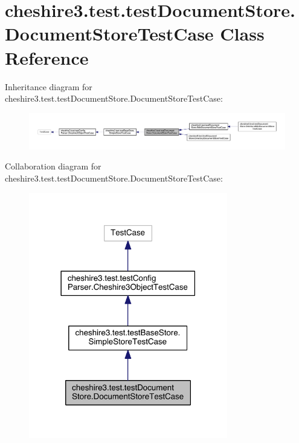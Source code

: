 \hypertarget{classcheshire3_1_1test_1_1test_document_store_1_1_document_store_test_case}{\section{cheshire3.\-test.\-test\-Document\-Store.\-Document\-Store\-Test\-Case Class Reference}
\label{classcheshire3_1_1test_1_1test_document_store_1_1_document_store_test_case}
}


Inheritance diagram for cheshire3.\-test.\-test\-Document\-Store.\-Document\-Store\-Test\-Case\-:
\nopagebreak
\begin{figure}[H]
\begin{center}
\leavevmode
\includegraphics[width=350pt]{classcheshire3_1_1test_1_1test_document_store_1_1_document_store_test_case__inherit__graph}
\end{center}
\end{figure}


Collaboration diagram for cheshire3.\-test.\-test\-Document\-Store.\-Document\-Store\-Test\-Case\-:
\nopagebreak
\begin{figure}[H]
\begin{center}
\leavevmode
\includegraphics[width=246pt]{classcheshire3_1_1test_1_1test_document_store_1_1_document_store_test_case__coll__graph}
\end{center}
\end{figure}
